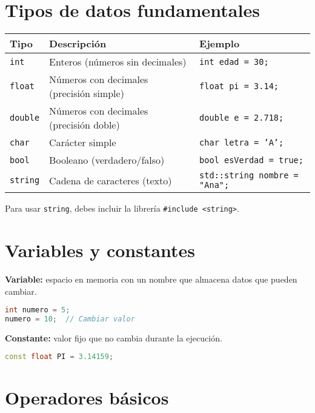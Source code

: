 \documentclass[a4paper]{article}
\begin{document}
\section{Tipos de datos fundamentales}

\begin{tabular}{|l|l|l|}
\hline
\textbf{Tipo} & \textbf{Descripción} & \textbf{Ejemplo} \\
\hline
\texttt{int} & Enteros (números sin decimales) & \texttt{int edad = 30;} \\
\texttt{float} & Números con decimales (precisión simple) & \texttt{float pi = 3.14;} \\
\texttt{double} & Números con decimales (precisión doble) & \texttt{double e = 2.718;} \\
\texttt{char} & Carácter simple & \texttt{char letra = 'A';} \\
\texttt{bool} & Booleano (verdadero/falso) & \texttt{bool esVerdad = true;} \\
\texttt{string} & Cadena de caracteres (texto) & \texttt{std::string nombre = "Ana";} \\
\hline
\end{tabular}

\vspace{0.3cm}
\noindent Para usar \texttt{string}, debes incluir la librería \texttt{\#include <string>}.

\section{Variables y constantes}

\textbf{Variable:} espacio en memoria con un nombre que almacena datos que pueden cambiar.

\begin{lstlisting}[language=C++]
int numero = 5;
numero = 10;  // Cambiar valor
\end{lstlisting}

\textbf{Constante:} valor fijo que no cambia durante la ejecución.

\begin{lstlisting}[language=C++]
const float PI = 3.14159;
\end{lstlisting}

\section{Operadores básicos}
\end{document}
